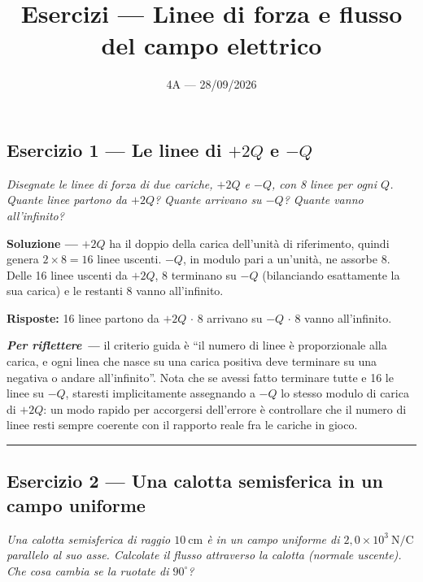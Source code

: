 \documentclass[11pt,a4paper]{scrartcl}
\title{\bfseries Esercizi --- Linee di forza e flusso del campo elettrico}
\author{4A --- 28/09/2026}
\date{}
\newcommand{\NC}{\ \text{N/C}}
\renewcommand{\deg}{^\circ}
\newenvironment{soluzione}{\par\noindent\textbf{Soluzione ---} }{\par}
\newenvironment{riflessione}{\par\noindent\textit{\textbf{Per riflettere ---} }}{\par}
\begin{document}
\maketitle
\vspace{-1.2em}

\bigskip

\subsection*{Esercizio 1 --- Le linee di $+2Q$ e $-Q$}

\begin{esercizio}
\emph{Disegnate le linee di forza di due cariche, $+2Q$ e $-Q$, con 8 linee per ogni $Q$.
Quante linee partono da $+2Q$? Quante arrivano su $-Q$? Quante vanno all'infinito?}
\end{esercizio}

\begin{soluzione}
$+2Q$ ha il doppio della carica dell'unità di riferimento, quindi genera $2\times8=16$ linee
uscenti. $-Q$, in modulo pari a un'unità, ne assorbe 8. Delle 16 linee uscenti da $+2Q$, 8
terminano su $-Q$ (bilanciando esattamente la sua carica) e le restanti 8 vanno all'infinito.

\textbf{Risposte:} 16 linee partono da $+2Q$ $\cdot$ 8 arrivano su $-Q$ $\cdot$ 8 vanno all'infinito.
\end{soluzione}

\begin{riflessione}
il criterio guida è ``il numero di linee è proporzionale alla carica, e ogni linea che nasce su
una carica positiva deve terminare su una negativa o andare all'infinito''. Nota che se avessi
fatto terminare tutte e 16 le linee su $-Q$, staresti implicitamente assegnando a $-Q$ lo stesso
modulo di carica di $+2Q$: un modo rapido per accorgersi dell'errore è controllare che il numero di
linee resti sempre coerente con il rapporto reale fra le cariche in gioco.
\end{riflessione}

\bigskip\hrule\bigskip

\subsection*{Esercizio 2 --- Una calotta semisferica in un campo uniforme}

\begin{esercizio}
\emph{Una calotta semisferica di raggio $10\ \text{cm}$ è in un campo uniforme di
$2{,}0\times10^3\NC$ parallelo al suo asse. Calcolate il flusso attraverso la calotta (normale
uscente). Che cosa cambia se la ruotate di $90\deg$?}
\end{esercizio}
\end{document}
